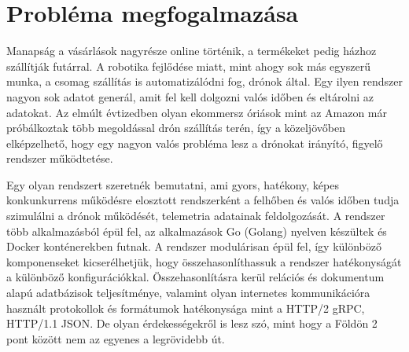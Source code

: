 
\section{Probléma megfogalmazása}
Manapság a vásárlások nagyrésze online történik, a termékeket pedig házhoz szállítják futárral.
A robotika fejlődése miatt, mint ahogy sok más egyszerű munka, a csomag szállítás is automatizálódni fog, drónok által.
Egy ilyen rendszer nagyon sok adatot generál, amit fel kell dolgozni valós időben és eltárolni az adatokat.
Az elmúlt évtizedben olyan ekommersz óriások mint az Amazon már próbálkoztak több megoldással drón szállítás terén, így a közeljövőben elképzelhető, hogy egy nagyon valós probléma lesz a drónokat irányító, figyelő rendszer működtetése.

Egy olyan rendszert szeretnék bemutatni, ami gyors, hatékony, képes konkunkurrens működésre elosztott rendszerként a felhőben és valós időben tudja szimulálni a drónok működését, telemetria adatainak feldolgozását.
A rendszer több alkalmazásból épül fel, az alkalmazások Go (Golang) nyelven készültek és Docker konténerekben futnak.
A rendszer modulárisan épül fel, így különböző komponenseket kicserélhetjük, hogy összehasonlíthassuk a rendszer hatékonyságát a különböző konfigurációkkal.
Összehasonlításra kerül relációs és dokumentum alapú adatbázisok teljesítménye, valamint olyan internetes kommunikációra használt protokollok és formátumok hatékonysága mint a HTTP/2 gRPC, HTTP/1.1 JSON.
De olyan érdekességekről is lesz szó, mint hogy a Földön 2 pont között nem az egyenes a legrövidebb út.



